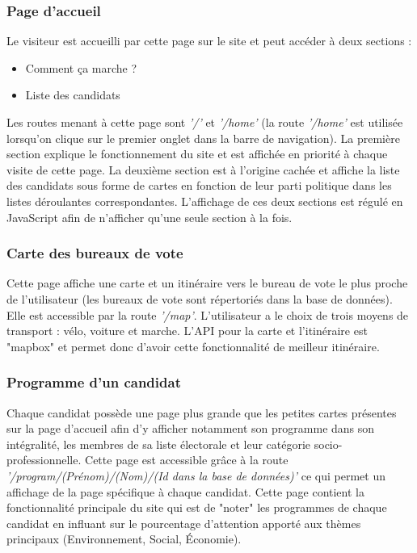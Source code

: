 \subsubsection{Page d'accueil}
\vskip 0.25cm
\noindent
Le visiteur est accueilli par cette page sur le site et peut accéder à deux sections :
\begin{itemize}
    \item Comment ça marche ?
    \item Liste des candidats
\end{itemize}
\vskip 0.25cm
\noindent
Les routes menant à cette page sont \textit{'/'} et \textit{'/home'} (la route \textit{'/home'} est utilisée lorsqu'on clique sur le premier onglet dans la barre de navigation).
\vskip 0.25cm
\noindent
La première section explique le fonctionnement du site et est affichée en priorité à chaque visite de cette page. La deuxième section est à l'origine cachée et affiche la liste des candidats sous forme de cartes en fonction de leur parti politique dans les listes déroulantes correspondantes. L'affichage de ces deux sections est régulé en JavaScript afin de n'afficher qu'une seule section à la fois.
\vskip 0.25cm
\subsubsection{Carte des bureaux de vote}
\vskip 0.25cm
\noindent
Cette page affiche une carte et un itinéraire vers le bureau de vote le plus proche de l'utilisateur (les bureaux de vote sont répertoriés dans la base de données). Elle est accessible par la route \textit{'/map'}. L'utilisateur a le choix de trois moyens de transport : vélo, voiture et marche. L'API pour la carte et l'itinéraire est "mapbox" et permet donc d'avoir cette fonctionnalité de meilleur itinéraire.
\vskip 0.25cm
\subsubsection{Programme d'un candidat}
\vskip 0.25cm
\noindent
Chaque candidat possède une page plus grande que les petites cartes présentes sur la page d'accueil afin d'y afficher notamment son programme dans son intégralité, les membres de sa liste électorale et leur catégorie socio-professionnelle. Cette page est accessible grâce à la route \textit{'/program/(Prénom)/(Nom)/(Id dans la base de données)'} ce qui permet un affichage de la page spécifique à chaque candidat.
\vskip 0.25cm
\noindent
Cette page contient la fonctionnalité principale du site qui est de "noter" les programmes de chaque candidat en influant sur le pourcentage d'attention apporté aux thèmes principaux (Environnement, Social, Économie).
\vskip 0.25cm
